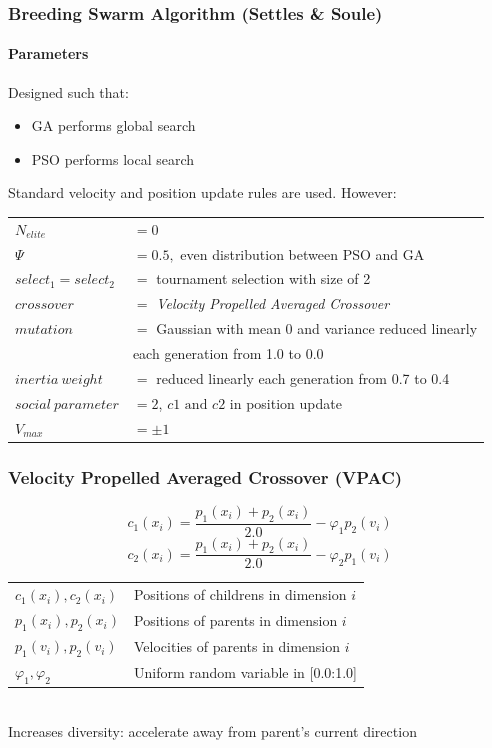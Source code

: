 \documentclass{beamer}
\begin{document}
\begin{frame}[fragile]
  \frametitle{Breeding Swarm Algorithm (Settles \& Soule)}
  \framesubtitle{Parameters}
  Designed such that:
  \begin{itemize}
    \item GA performs global search
    \item PSO performs local search
  \end{itemize}
  \bigskip
  Standard velocity and position update rules are used. However: \\
  \begin{tabular}{ll}
  $N_{elite}$ & $ = 0$\\
  $\Psi$ & $ = 0.5, $ even distribution between PSO and GA \\
  $select_1 = select_2 $ & $ = $ tournament selection with size of 2\\
  $crossover$ & $ = $ \emph{Velocity Propelled Averaged Crossover} \\
  $mutation$ & $ = $ Gaussian with mean 0 and variance reduced linearly \\
  & each generation from 1.0 to 0.0 \\
  $inertia \: weight$  & $ = $ reduced linearly each generation from 0.7 to 0.4 \\
  $social \: parameter$ & $ = 2$, $c1 \mbox{ and } c2$ in position update\\
  $V_{max} $ & $ = \pm 1$ \\
  \end{tabular}
\end{frame}
\begin{frame}
  \frametitle{Velocity Propelled Averaged Crossover (VPAC)}
  \begin{equation}
   c_1(x_i) = \frac{p_1(x_i) + p_2(x_i)}{2.0} - \varphi_1 p_2(v_i)
  \end{equation}
  \begin{equation}
   c_2(x_i) = \frac{p_1(x_i) + p_2(x_i)}{2.0} - \varphi_2 p_1(v_i)
  \end{equation}
  \bigskip
  \bigskip
  \begin{tabular}{ll}
  $c_1(x_i), c_2(x_i) $ & Positions of childrens in dimension $i$\\
  $p_1(x_i), p_2(x_i) $ & Positions of parents in dimension $i$\\
  $p_1(v_i), p_2(v_i) $ & Velocities of parents in dimension $i$\\
  $\varphi_1, \varphi_2 $ & Uniform random variable in [0.0:1.0]\\
  \end{tabular}\\
  Increases diversity: accelerate away from parent's current direction
\end{frame}
\end{document}
